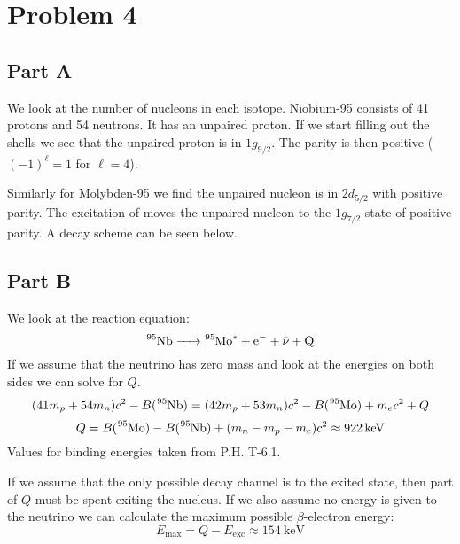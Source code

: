 \documentclass[a4paper, parskip=half, twopage]{scrartcl}
\begin{document}
\section*{Problem 4}

\subsection*{Part A}

We look at the number of nucleons in each isotope. Niobium-95 consists of 41 protons and 54 neutrons. It has an unpaired proton. If we start filling out the shells we see that the unpaired proton is in $1g_{9/2}$. The parity is then positive ($(-1)^\ell = 1$ for $\ell = 4$).

Similarly for Molybden-95 we find the unpaired nucleon is in $2d_{5/2}$ with positive parity. The excitation of  moves the unpaired nucleon to the $1g_{7/2}$ state of positive parity. A decay scheme can be seen below.

\begin{center}
\end{center}

\subsection*{Part B}

We look at the reaction equation:
\[
\ce{^{95}Nb -> ^{95}Mo^* + e^- + \bar{\nu} + Q}
\]
If we assume that the neutrino has zero mass and look at the energies on both sides we can solve for $Q$.
\[
(41m_p + 54m_n)c^2 - B(\ce{^{95}Nb}) = (42m_p + 53m_n)c^2 - B(\ce{^{95}Mo}) + m_e c^2 + Q
\]
\[
Q = B(\ce{^{95}Mo}) - B(\ce{^{95}Nb}) + (m_n - m_p - m_e)c^2 \approx \SI{922}{\keV}
\]
Values for binding energies taken from P.H. T-6.1.

If we assume that the only possible decay channel is to the exited  state, then part of $Q$ must be spent exiting the nucleus. If we also assume no energy is given to the neutrino we can calculate the maximum possible $\beta$-electron energy:
\[
E_{\text{max}} = Q - E_{\text{exc}} \approx \SI{154}{\keV}
\]
\end{document}
